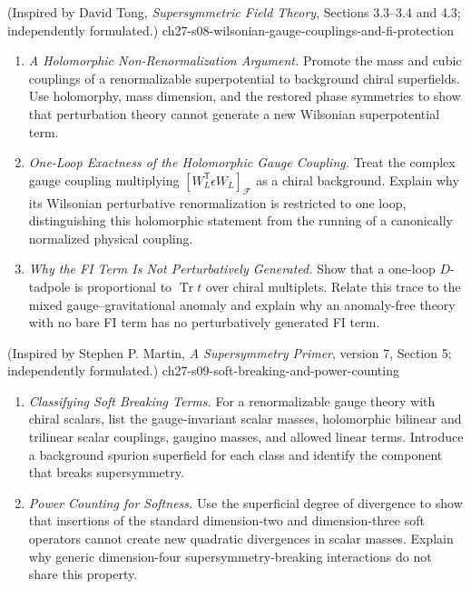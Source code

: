 \begin{enumerate}
    {(Inspired by David Tong, \emph{Supersymmetric Field Theory}, Sections 3.3--3.4 and 4.3; independently formulated.)}
    {ch27-s08-wilsonian-gauge-couplings-and-fi-protection}
  \begin{enumerate}
    \item \emph{A Holomorphic Non-Renormalization Argument.}
    Promote the mass and cubic couplings of a renormalizable superpotential
      to background chiral superfields.  Use holomorphy, mass dimension, and
      the restored phase symmetries to show that perturbation theory cannot
      generate a new Wilsonian superpotential term.
    \item \emph{One-Loop Exactness of the Holomorphic Gauge Coupling.}
    Treat the complex gauge coupling multiplying
      \([W_L^{\mathsf T}\epsilon W_L]_{\mathcal F}\) as a chiral background.
      Explain why its Wilsonian perturbative renormalization is restricted to
      one loop, distinguishing this holomorphic statement from the running of
      a canonically normalized physical coupling.
    \item \emph{Why the FI Term Is Not Perturbatively Generated.}
    Show that a one-loop \(D\)-tadpole is proportional to
      \(\operatorname{Tr}t\) over chiral multiplets.  Relate this trace to the
      mixed gauge--gravitational anomaly and explain why an anomaly-free theory
      with no bare FI term has no perturbatively generated FI term.
  \end{enumerate}

    {(Inspired by Stephen P. Martin, \emph{A Supersymmetry Primer}, version 7, Section 5; independently formulated.)}
    {ch27-s09-soft-breaking-and-power-counting}
  \begin{enumerate}
    \item \emph{Classifying Soft Breaking Terms.}
    For a renormalizable gauge theory with chiral scalars, list the
      gauge-invariant scalar masses, holomorphic bilinear and trilinear scalar
      couplings, gaugino masses, and allowed linear terms.  Introduce a
      background spurion superfield for each class and identify the component
      that breaks supersymmetry.
    \item \emph{Power Counting for Softness.}
    Use the superficial degree of divergence to show that insertions of the
      standard dimension-two and dimension-three soft operators cannot create
      new quadratic divergences in scalar masses.  Explain why generic
      dimension-four supersymmetry-breaking interactions do not share this
      property.
  \end{enumerate}


\end{enumerate}
